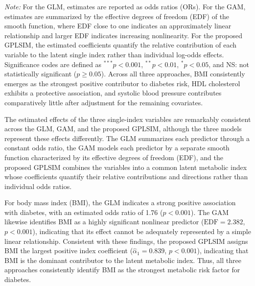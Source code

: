 \begin{table}[ht!]
\begin{minipage}{0.96\textwidth}
\footnotesize
\textit{Note:}
For the GLM, estimates are reported as odds ratios (ORs). For the GAM, estimates are summarized by the effective degrees of freedom (EDF) of the smooth function, where EDF close to one indicates an approximately linear relationship and larger EDF indicates increasing nonlinearity. For the proposed GPLSIM, the estimated coefficients quantify the relative contribution of each variable to the latent single index rather than individual log-odds effects. Significance codes are defined as $^{***}p<0.001$, $^{**}p<0.01$, $^{*}p<0.05$, and NS: not statistically significant ($p\ge0.05$). Across all three approaches, BMI consistently emerges as the strongest positive contributor to diabetes risk, HDL cholesterol exhibits a protective association, and systolic blood pressure contributes comparatively little after adjustment for the remaining covariates.
\end{minipage}

\end{table}


The estimated effects of the three single-index variables are remarkably consistent across the GLM, GAM, and the proposed GPLSIM, although the three models represent these effects differently. The GLM summarizes each predictor through a constant odds ratio, the GAM models each predictor by a separate smooth function characterized by its effective degrees of freedom (EDF), and the proposed GPLSIM combines the variables into a common latent metabolic index whose coefficients quantify their relative contributions and directions rather than individual odds ratios.

For body mass index (BMI), the GLM indicates a strong positive association with diabetes, with an estimated odds ratio of 1.76 ($p<0.001$). The GAM likewise identifies BMI as a highly significant nonlinear predictor ($\mathrm{EDF}=2.382$, $p<0.001$), indicating that its effect cannot be adequately represented by a simple linear relationship. Consistent with these findings, the proposed GPLSIM assigns BMI the largest positive index coefficient ($\hat{\alpha}_1=0.839$, $p<0.001$), indicating that BMI is the dominant contributor to the latent metabolic index. Thus, all three approaches consistently identify BMI as the strongest metabolic risk factor for diabetes.

